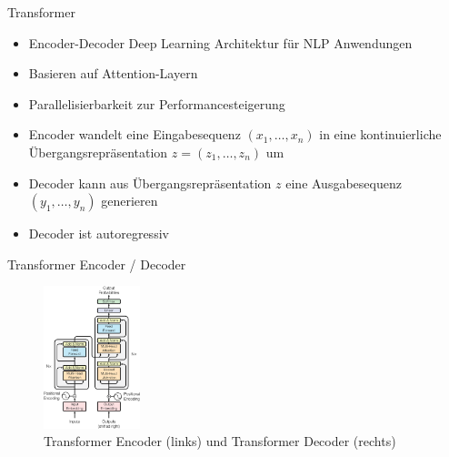 

\begin{frame}{Transformer }
  \begin{itemize}
      \item Encoder-Decoder Deep Learning Architektur für NLP Anwendungen
      \item Basieren auf Attention-Layern
      \item Parallelisierbarkeit zur Performancesteigerung
      \item Encoder wandelt eine Eingabesequenz $(x_1,\ldots,x_n)$ in eine kontinuierliche Übergangsrepräsentation $z=(z_1, \ldots, z_n)$ um
      \item Decoder kann aus Übergangsrepräsentation $z$ eine Ausgabesequenz $(y_1, \ldots, y_n)$ generieren
      \item Decoder ist autoregressiv
  \end{itemize}
\end{frame}

\begin{frame}{Transformer Encoder / Decoder}
  \begin{figure}
    \includegraphics[width=0.25\textwidth]{bilder/Transformer-Encoder-Decoder.png}
    \caption{Transformer Encoder (links) und Transformer Decoder (rechts)}
    \end{figure}
\end{frame}



